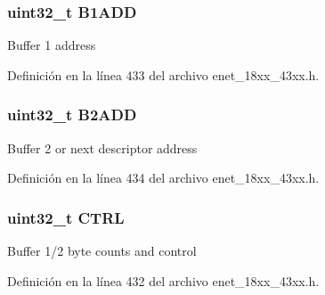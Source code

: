 \subsubsection[{\texorpdfstring{B1\+A\+DD}{B1ADD}}]{ uint32\+\_\+t B1\+A\+DD}\hypertarget{struct_e_n_e_t___r_x_d_e_s_c___t_a9b99a80d13d854bce5c3f9646964c34e}{}\label{struct_e_n_e_t___r_x_d_e_s_c___t_a9b99a80d13d854bce5c3f9646964c34e}
Buffer 1 address 

Definición en la línea 433 del archivo enet\+\_\+18xx\+\_\+43xx.\+h.

\subsubsection[{\texorpdfstring{B2\+A\+DD}{B2ADD}}]{ uint32\+\_\+t B2\+A\+DD}\hypertarget{struct_e_n_e_t___r_x_d_e_s_c___t_a3cf5d995cea5c3b42b9224871c5b18a1}{}\label{struct_e_n_e_t___r_x_d_e_s_c___t_a3cf5d995cea5c3b42b9224871c5b18a1}
Buffer 2 or next descriptor address 

Definición en la línea 434 del archivo enet\+\_\+18xx\+\_\+43xx.\+h.

\subsubsection[{\texorpdfstring{C\+T\+RL}{CTRL}}]{ uint32\+\_\+t C\+T\+RL}\hypertarget{struct_e_n_e_t___r_x_d_e_s_c___t_a15fc8d35f045f329b80c544bef35ff64}{}\label{struct_e_n_e_t___r_x_d_e_s_c___t_a15fc8d35f045f329b80c544bef35ff64}
Buffer 1/2 byte counts and control 

Definición en la línea 432 del archivo enet\+\_\+18xx\+\_\+43xx.\+h.

